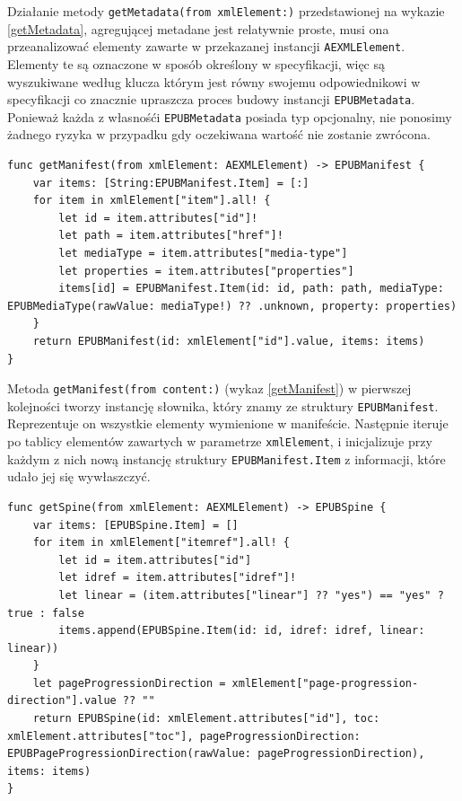 Działanie metody \texttt{getMetadata(from xmlElement:)} przedstawionej na wykazie \ref{getMetadata}, agregującej metadane jest relatywnie proste, musi ona przeanalizować elementy zawarte w przekazanej instancji \texttt{AEXMLElement}. Elementy te są oznaczone w sposób określony w specyfikacji, więc są wyszukiwane według klucza którym jest równy swojemu odpowiednikowi w specyfikacji co znacznie upraszcza proces budowy instancji \texttt{EPUBMetadata}. Ponieważ każda z własnośći \texttt{EPUBMetadata} posiada typ opcjonalny, nie ponosimy żadnego ryzyka w przypadku gdy oczekiwana wartość nie zostanie zwrócona.

\begin{lstlisting}[caption={Implementacja metody \texttt{getManifest(from xmlElement:)}},language=swift-reference,label=getManifest]
func getManifest(from xmlElement: AEXMLElement) -> EPUBManifest {
    var items: [String:EPUBManifest.Item] = [:]
    for item in xmlElement["item"].all! {
        let id = item.attributes["id"]!
        let path = item.attributes["href"]!
        let mediaType = item.attributes["media-type"]
        let properties = item.attributes["properties"]
        items[id] = EPUBManifest.Item(id: id, path: path, mediaType: EPUBMediaType(rawValue: mediaType!) ?? .unknown, property: properties)
    }
    return EPUBManifest(id: xmlElement["id"].value, items: items)
}
\end{lstlisting}

Metoda \texttt{getManifest(from content:)} (wykaz \ref{getManifest}) w pierwszej kolejności tworzy instancję słownika, który znamy ze struktury \texttt{EPUBManifest}. Reprezentuje on wszystkie elementy wymienione w manifeście. Następnie iteruje po tablicy elementów zawartych w parametrze \texttt{xmlElement}, i inicjalizuje przy każdym z nich nową instancję struktury \texttt{EPUBManifest.Item} z informacji, które udało jej się wywłaszczyć.

\begin{lstlisting}[caption={Implementacja metody \texttt{getSpine(from xmlElement:)}},language=swift-reference,label=getSpine]
func getSpine(from xmlElement: AEXMLElement) -> EPUBSpine {
    var items: [EPUBSpine.Item] = []
    for item in xmlElement["itemref"].all! {
        let id = item.attributes["id"]
        let idref = item.attributes["idref"]!
        let linear = (item.attributes["linear"] ?? "yes") == "yes" ? true : false
        items.append(EPUBSpine.Item(id: id, idref: idref, linear: linear))
    }
    let pageProgressionDirection = xmlElement["page-progression-direction"].value ?? ""
    return EPUBSpine(id: xmlElement.attributes["id"], toc: xmlElement.attributes["toc"], pageProgressionDirection: EPUBPageProgressionDirection(rawValue: pageProgressionDirection), items: items)
}
\end{lstlisting}

